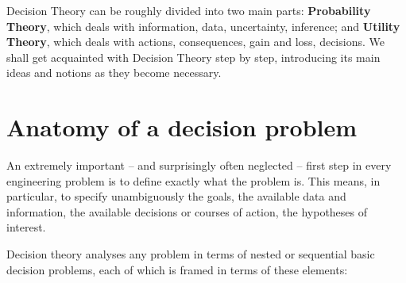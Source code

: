 \documentclass[
  a4paper,
  DIV=11,
  numbers=noendperiod,
  oneside]{scrreprt}
\begin{document}
Decision Theory can be roughly divided into two main parts:
{\textbf{Probability Theory}}, which deals with information, data,
uncertainty, inference; and {\textbf{Utility Theory}}, which deals with
actions, consequences, gain and loss, decisions. We shall get acquainted
with Decision Theory step by step, introducing its main ideas and
notions as they become necessary.

\hypertarget{anatomy-of-a-decision-problem}{%
\section{Anatomy of a decision
problem}\label{anatomy-of-a-decision-problem}}

An extremely important -- and surprisingly often neglected -- first step
in every engineering problem is to define exactly what the problem is.
This means, in particular, to specify unambiguously the goals, the
available data and information, the available decisions or courses of
action, the hypotheses of interest.

Decision theory analyses any problem in terms of nested or sequential
basic decision problems, each of which is framed in terms of these
elements:

\end{document}
